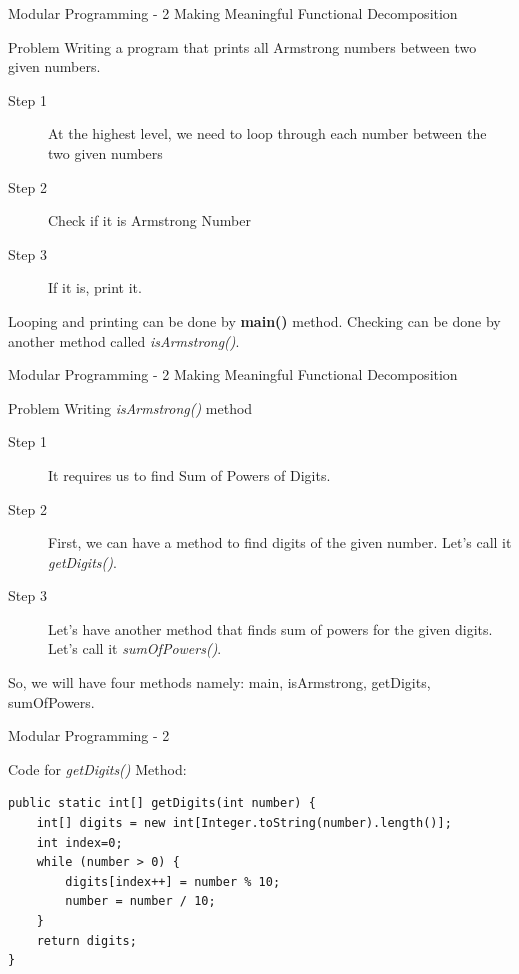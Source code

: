 \documentclass[14pt]{beamer}
\begin{document}
\begin{frame}[fragile]{Modular Programming - 2}
\small
Making Meaningful Functional Decomposition
\begin{block}{Problem}
Writing a program that prints all Armstrong numbers between two given numbers.
\end{block}
\begin{description}
\item [Step 1] At the highest level, we need to loop through each number between the two given numbers
\item [Step 2] Check if it is Armstrong Number
\item [Step 3] If it is, print it.
\end{description}
Looping and printing can be done by \textbf{main()} method. Checking can be done by another method called \emph{isArmstrong()}.
\end{frame}

\begin{frame}[fragile]{Modular Programming - 2}
\small
Making Meaningful Functional Decomposition
\begin{block}{Problem}
Writing \emph{isArmstrong()} method
\end{block}
\begin{description}
\item [Step 1] It requires us to find Sum of Powers of Digits.
\item [Step 2] First, we can have a method to find digits of the given number. Let's call it \emph{getDigits()}.
\item [Step 3] Let's have another method that finds sum of powers for the given digits. Let's call it \emph{sumOfPowers()}.
\end{description}
So, we will have four methods namely: main, isArmstrong, getDigits, sumOfPowers.
\end{frame}

\begin{frame}[fragile]{Modular Programming - 2}
\begin{block}{Code for \emph{getDigits()} Method:}
\begin{lstlisting}[numbers=none]
public static int[] getDigits(int number) {
    int[] digits = new int[Integer.toString(number).length()];
    int index=0;
    while (number > 0) {
        digits[index++] = number % 10;
        number = number / 10;
    }
    return digits;
}
\end{lstlisting}
\end{block}
\end{frame}
\end{document}
